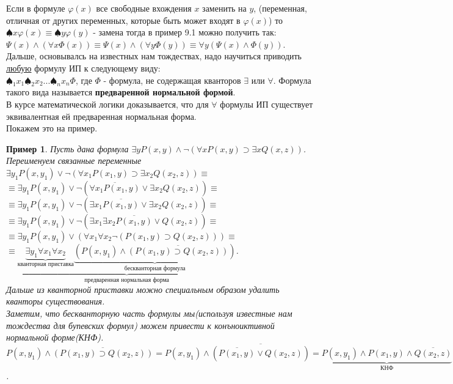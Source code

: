 \documentclass{article}
\newtheorem{example}{Пример}
\numberwithin{example}{section}
\numberwithin{question}{section}
\numberwithin{Remark}{section}
\numberwithin{theorem}{section}
\numberwithin{definition}{section}
\numberwithin{proposition}{section}
\begin{document}
	Если в формуле $\varphi(x)$ все свободные вхождения $x$ заменить на $y$, (переменная, отличная от других переменных, которые быть может входят в $\varphi(x)$) то $\spadesuit x \varphi(x)\equiv \spadesuit y \varphi(y)$ - замена тогда в пример 9.1 можно получить так:\\
	$\Psi(x)\land(\forall x \Phi(x))\equiv \Psi(x)\land (\forall y \Phi(y))\equiv \forall y(\Psi(x)\land \Phi(y))$.\\
	Дальше, основывалсь на известных нам тождествах, надо научиться приводить \underline{любую} формулу ИП к следующему виду:\\
	$\spadesuit_1 x_1 \spadesuit_2 x_2 ... \spadesuit_n x_n \Phi$, где $\Phi$ - формула, не содержащая кванторов $\exists$ или $\forall$. Формула такого вида называется \textbf{предваренной нормальной формой}.\\
	В курсе математической логики доказывается, что для $\forall$ формулы ИП существует эквивалентная ей предваренная нормальная форма.\\
	Покажем это на пример.
	\begin{example}
		Пусть дана формула $\exists yP(x,y)\land \lnot(\forall xP(x,y)\supset \exists xQ(x,z))$.\\
		Переименуем связанные переменные\\
		$\exists y_1 P(x,y_1)\lor \lnot(\forall x_1 P(x_1,y)\supset \exists x_2 Q(x_2,z))\equiv$\\
		$\equiv \exists y_1 P(x,y_1)\lor \lnot(\overline{\forall x_1 P(x_1,y)}\lor \exists x_2 Q(x_2,z))\equiv$\\
		$\equiv \exists y_1 P(x,y_1)\lor \lnot(\exists x_1 \overline{P(x_1,y)}\lor \exists x_2 Q(x_2,z))\equiv$\\
		$\equiv \exists y_1 P(x,y_1)\lor \lnot(\exists x_1 \exists x_2 \overline{P(x_1,y)}\lor Q(x_2,z))\equiv$\\
		$\equiv \exists y_1 P(x,y_1)\lor (\forall x_1 \forall x_2 \lnot(P(x_1,y)\supset Q(x_2,z)))\equiv$\\
		$\equiv \underbrace{\underbrace{\exists y_1 \forall x_1 \forall x_2}_{\text{кванторная приставка}}\underbrace{(P(x,y_1)\land \overline{(P(x_1,y)\supset Q(x_2,z))})}_{\text{бескванторная формула}}}_{\text{предваренная нормальная форма}}$.\\
		Дальше из кванторной приставки можно специальным образом удалить кванторы существования.\\
		Заметим, что бескванторную часть формулы мы(используя известные нам тождества для бупевских формул) можем привести к конъноиктивной нормальной форме(КНФ).\\
		$P(x,y_1)\land \overline{(P(x_1,y)\supset Q(x_2,z))}=P(x,y_1)\land \overline{(\overline{P(x_1,y)}\lor Q(x_2,z))}=\underbrace{P(x,y_1)\land P(x_1,y)\land \overline{Q(x_2,z)}}_{\text{КНФ}}$.
	\end{example}
\end{document}
